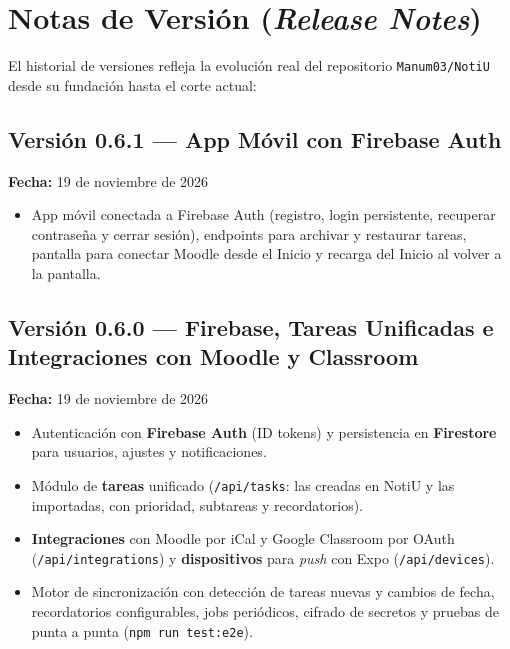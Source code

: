 \documentclass[11pt,letterpaper]{article}
\begin{document}
\section{Notas de Versión (\emph{Release Notes})}

El historial de versiones refleja la evolución real del repositorio \texttt{Manum03/NotiU} desde su fundación hasta el corte actual:

\subsection*{\textcolor{carmesiVivido}{Versión 0.6.1} --- App Móvil con Firebase Auth}
\textbf{Fecha:} 19 de noviembre de 2026
\begin{itemize}[leftmargin=1.5em, itemsep=2pt]
  \item App móvil conectada a Firebase Auth (registro, login persistente, recuperar contraseña y cerrar sesión), endpoints para archivar y restaurar tareas, pantalla para conectar Moodle desde el Inicio y recarga del Inicio al volver a la pantalla.
\end{itemize}

\subsection*{\textcolor{carmesiVivido}{Versión 0.6.0} --- Firebase, Tareas Unificadas e Integraciones con Moodle y Classroom}
\textbf{Fecha:} 19 de noviembre de 2026
\begin{itemize}[leftmargin=1.5em, itemsep=2pt]
  \item Autenticación con \textbf{Firebase Auth} (ID tokens) y persistencia en \textbf{Firestore} para usuarios, ajustes y notificaciones.
  \item Módulo de \textbf{tareas} unificado (\texttt{/api/tasks}: las creadas en NotiU y las importadas, con prioridad, subtareas y recordatorios).
  \item \textbf{Integraciones} con Moodle por iCal y Google Classroom por OAuth (\texttt{/api/integrations}) y \textbf{dispositivos} para \emph{push} con Expo (\texttt{/api/devices}).
  \item Motor de sincronización con detección de tareas nuevas y cambios de fecha, recordatorios configurables, jobs periódicos, cifrado de secretos y pruebas de punta a punta (\texttt{npm run test:e2e}).
\end{itemize}
\end{document}
